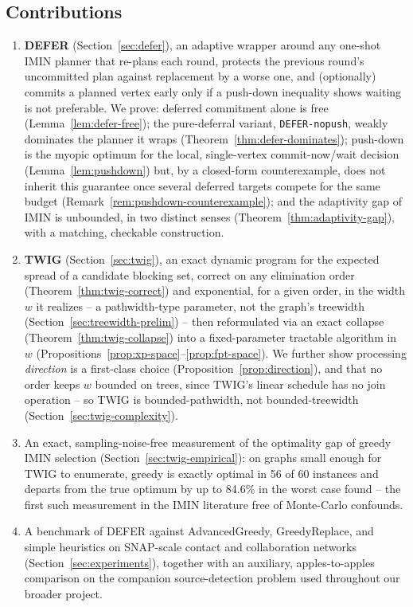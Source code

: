 \documentclass[ijoc,sglanonrev]{informs4}
\begin{document}
\subsection*{Contributions}
\begin{enumerate}
\item \textbf{DEFER} (Section~\ref{sec:defer}), an adaptive wrapper around
  any one-shot IMIN planner that re-plans each round, protects the
  previous round's uncommitted plan against replacement by a worse one,
  and (optionally) commits a planned vertex early only if a push-down
  inequality shows waiting is not preferable. We prove: deferred
  commitment alone is free (Lemma~\ref{lem:defer-free}); the pure-deferral
  variant, \texttt{DEFER-nopush}, weakly dominates the planner it wraps
  (Theorem~\ref{thm:defer-dominates}); push-down is the myopic optimum for
  the local, single-vertex commit-now/wait decision
  (Lemma~\ref{lem:pushdown}) but, by a closed-form counterexample, does
  not inherit this guarantee once several deferred targets compete for
  the same budget (Remark~\ref{rem:pushdown-counterexample}); and the
  adaptivity gap of IMIN is unbounded, in two distinct senses
  (Theorem~\ref{thm:adaptivity-gap}), with a matching, checkable
  construction.
\item \textbf{TWIG} (Section~\ref{sec:twig}), an exact dynamic program for
  the expected spread of a candidate blocking set, correct on any
  elimination order (Theorem~\ref{thm:twig-correct}) and exponential, for
  a given order, in the width $w$ it realizes -- a pathwidth-type
  parameter, not the graph's treewidth (Section~\ref{sec:treewidth-prelim}) --
  then reformulated via an exact collapse (Theorem~\ref{thm:twig-collapse})
  into a fixed-parameter tractable algorithm in $w$
  (Propositions~\ref{prop:xp-space}--\ref{prop:fpt-space}). We further show
  processing \emph{direction} is a first-class choice
  (Proposition~\ref{prop:direction}), and that no order keeps $w$ bounded
  on trees, since TWIG's linear schedule has no join operation -- so TWIG
  is bounded-pathwidth, not bounded-treewidth
  (Section~\ref{sec:twig-complexity}).
\item An exact, sampling-noise-free measurement of the optimality gap of
  greedy IMIN selection (Section~\ref{sec:twig-empirical}): on graphs small
  enough for TWIG to enumerate, greedy is exactly optimal in 56 of 60
  instances and departs from the true optimum by up to 84.6\% in the worst
  case found -- the first such measurement in the IMIN literature free of
  Monte-Carlo confounds.
\item A benchmark of DEFER against AdvancedGreedy, GreedyReplace, and
  simple heuristics on SNAP-scale contact and collaboration networks
  (Section~\ref{sec:experiments}), together with an auxiliary,
  apples-to-apples comparison on the companion source-detection problem
  used throughout our broader project.
\end{enumerate}
\end{document}
